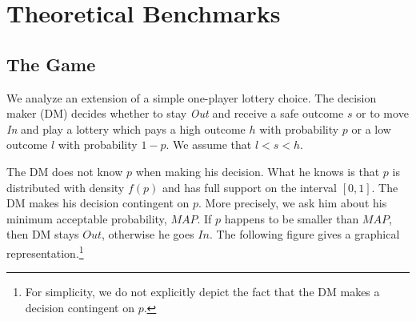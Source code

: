 %
%
%



\clearpage
\pagebreak



\clearpage
\pagebreak

\appendix
\section{Theoretical Benchmarks}
\label{section:appendixa}
\setcounter{figure}{0}
\setcounter{table}{0}
\renewcommand{\thefigure}{A.\arabic{figure}}
\renewcommand{\thetable}{A.\arabic{table}}
\subsection{The Game}

We analyze an extension of a simple one-player lottery choice.
The decision maker (DM) decides whether to stay \emph{Out} and receive a safe outcome $s$ or to move \emph{In} and play a lottery which pays a high outcome $h$ with probability $p$ or a low outcome $l$ with probability $1-p$.
We assume that $l < s < h$. 

The DM does not know $p$ when making his decision.
What he knows is that $p$ is distributed with density $f(p)$ and has full support on the interval $[0,1]$.
The DM makes his decision contingent on $p$.
More precisely, we ask him about his minimum acceptable probability, $MAP$.
If $p$ happens to be smaller than $MAP$, then DM stays $Out$, otherwise he goes $In$.
The following figure gives a graphical representation.\footnote{
For simplicity, we do not explicitly depict the fact that the DM makes a decision contingent on $p$.
} 

